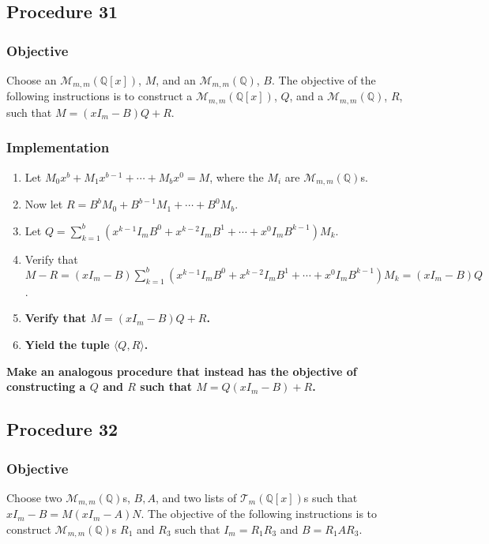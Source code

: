 \documentclass[twocolumn]{article}
\begin{document}
		\subsection{Procedure 31}\label{sec:procedure 31}
			\subsubsection{Objective}
				Choose an $\mathcal{M}_{m,m}(\mathbb{Q}[x])$, $M$, and an $\mathcal{M}_{m,m}(\mathbb{Q})$, $B$. The objective of the following instructions is to construct a $\mathcal{M}_{m,m}(\mathbb{Q}[x])$, $Q$, and a $\mathcal{M}_{m,m}(\mathbb{Q})$, $R$, such that $M=(xI_m-B)Q+R$.
			\subsubsection{Implementation}
				\begin{enumerate}
					\item Let $M_0x^b+M_1x^{b-1}+\cdots+M_bx^0=M$, where the $M_i$ are $\mathcal{M}_{m,m}(\mathbb{Q})$s.
					\item Now let $R=B^bM_0+B^{b-1}M_1+\cdots+B^0M_b$.
					\item Let $Q=\sum_{k=1}^b (x^{k-1}I_mB^0+x^{k-2}I_mB^1+\cdots+x^0I_mB^{k-1})M_k$.
					\item Verify that $M-R=(xI_m-B)\sum_{k=1}^b (x^{k-1}I_mB^0+x^{k-2}I_mB^1+\cdots+x^0I_mB^{k-1})M_k=(xI_m-B)Q$.
					\item \textbf{Verify that $M=(xI_m-B)Q+R$.}
					\item \textbf{Yield the tuple $\langle Q,R\rangle$.}
				\end{enumerate}
			\textbf{Make an analogous procedure that instead has the objective of constructing a $Q$ and $R$ such that $M=Q(xI_m-B)+R$.}
		\subsection{Procedure 32}\label{sec:procedure 32}
			\subsubsection{Objective}
				Choose two $\mathcal{M}_{m,m}(\mathbb{Q})$s, $B,A$, and two lists of $\mathcal{T}_{m}(\mathbb{Q}[x])$s such that $xI_m-B=M(xI_m-A)N$. The objective of the following instructions is to construct $\mathcal{M}_{m,m}(\mathbb{Q})$s $R_1$ and $R_3$ such that $I_m=R_1R_3$ and $B=R_1AR_3$.
\end{document}
